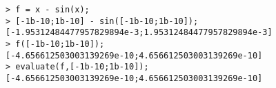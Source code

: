 \begin{center}\begin{minipage}{15cm}\begin{Verbatim}[frame=single]
> f = x - sin(x);
> [-1b-10;1b-10] - sin([-1b-10;1b-10]);
[-1.95312484477957829894e-3;1.95312484477957829894e-3]
> f([-1b-10;1b-10]);
[-4.656612503003139269e-10;4.656612503003139269e-10]
> evaluate(f,[-1b-10;1b-10]);
[-4.656612503003139269e-10;4.656612503003139269e-10]
\end{Verbatim}
\end{minipage}\end{center}
